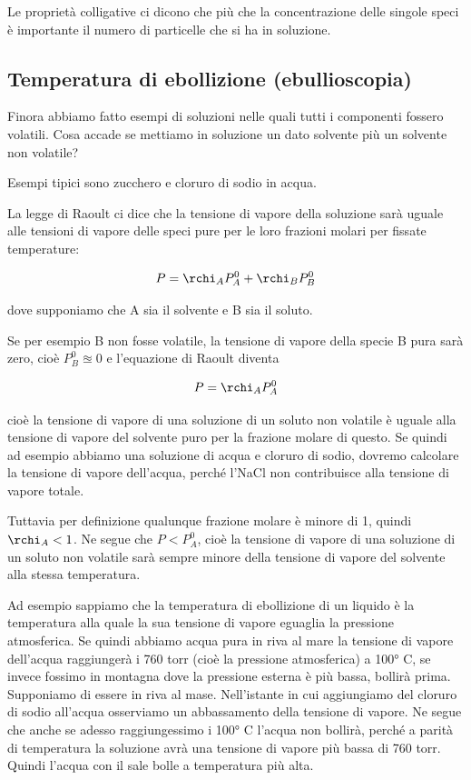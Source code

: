 Le proprietà colligative ci dicono che più che la concentrazione delle singole speci è importante il numero di particelle che si ha in soluzione.
\subsection{Temperatura di ebollizione (ebullioscopia)}
Finora abbiamo fatto esempi di soluzioni nelle quali tutti i componenti fossero volatili. Cosa accade se mettiamo in soluzione un dato solvente più un solvente non volatile?

Esempi tipici sono zucchero e cloruro di sodio in acqua.

La legge di Raoult ci dice che la tensione di vapore della soluzione sarà uguale alle tensioni di vapore delle speci pure per le loro frazioni molari per fissate temperature:

$$P=\rchi_AP^0_A + \rchi_BP^0_B$$

dove supponiamo che A sia il solvente e B sia il soluto.

Se per esempio B non fosse volatile, la tensione di vapore della specie B pura sarà zero, cioè $P_B^0 \approxeq 0$ e l'equazione di Raoult diventa

$$P=\rchi_A P_A^0$$

cioè la tensione di vapore di una soluzione di un soluto non volatile è uguale alla tensione di vapore del solvente puro per la frazione molare di questo. Se quindi ad esempio abbiamo una soluzione di acqua e cloruro di sodio, dovremo calcolare la tensione di vapore dell'acqua, perché l'NaCl non contribuisce alla tensione di vapore totale.

Tuttavia per definizione qualunque frazione molare è minore di 1, quindi $\rchi_A<1$. Ne segue che $P < P_A^0$, cioè la tensione di vapore di una soluzione di un soluto non volatile sarà sempre minore della tensione di vapore del solvente alla stessa temperatura.

Ad esempio sappiamo che la temperatura di ebollizione di un liquido è la temperatura alla quale la sua tensione di vapore eguaglia la pressione atmosferica. Se quindi abbiamo acqua pura in riva al mare la tensione di vapore dell'acqua raggiungerà i 760 torr (cioè la pressione atmosferica) a 100° C, se invece fossimo in montagna dove la pressione esterna è più bassa, bollirà prima. Supponiamo di essere in riva al mase. Nell'istante in cui aggiungiamo del cloruro di sodio all'acqua osserviamo un abbassamento della tensione di vapore. Ne segue che anche se adesso raggiungessimo i 100° C l'acqua non bollirà, perché a parità di temperatura la soluzione avrà una tensione di vapore più bassa di 760 torr. Quindi l'acqua con il sale bolle a temperatura più alta.


